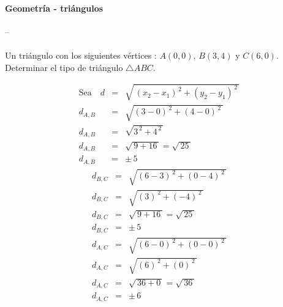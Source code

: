 \documentclass[11pt, twocolumn, landscape, a4paper]{article}
\begin{document}
\paragraph*{Geometría - triángulos} -- \\ \\
\noindent Un triángulo con los siguientes vértices : $A(0, 0)$, $B(3, 4)$ y $C(6, 0)$. \\ Determinar el tipo de triángulo $\triangle ABC$.

\begin{eqnarray*}
\text{Sea}\quad d &=& \sqrt{\,(x_{2} - x_{1})^{\,2} + (y_{2} - y_{1})^{\,2}\,} \\
d_{A, B} &=& \sqrt{ (3 - 0)^{\,2} + (4 - 0)^{\,2}\,} \\
d_{A, B} &=& \sqrt{ 3^{\,2} + 4^{\,2}\,} \\
d_{A, B} &=& \sqrt{\,9 + 16\,} = \sqrt{\,25\,}\\
d_{A, B} &=& \pm\, 5
\end{eqnarray*}
\begin{eqnarray*}
d_{B, C} &=& \sqrt{ (6 - 3)^{\,2} + (0 - 4)^{\,2}\,} \\
d_{B, C} &=& \sqrt{ (3)^{\,2} + (-4)^{\,2}\,} \\
d_{B, C} &=& \sqrt{\,9 + 16\,} = \sqrt{\,25\,} \\
d_{B, C} &=& \pm\, 5
\end{eqnarray*}
\begin{eqnarray*}
d_{A, C} &=& \sqrt{ (6 - 0)^{\,2} + (0 - 0)^{\,2}\,} \\
d_{A, C} &=& \sqrt{ (6)^{\,2} + (0)^{\,2}\,} \\
d_{A, C} &=& \sqrt{\,36 + 0\,} = \sqrt{\,36\,} \\
d_{A, C} &=& \pm\, 6
\end{eqnarray*}
\end{document}
